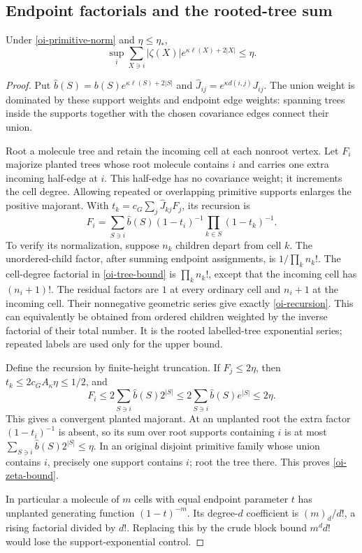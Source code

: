 \subsection{Endpoint factorials and the rooted-tree sum}

\begin{lemma}\label{oi-tree-lemma}
Under \eqref{oi-primitive-norm} and $\eta\le\eta_*$,
\begin{equation}\label{oi-zeta-bound}
 \sup_i\sum_{X\ni i}|\zeta(X)|
                  e^{\kappa\ell(X)+2|X|}\le\eta .
\end{equation}
\end{lemma}
\begin{proof}
Put $\widehat b(S)=b(S)e^{\kappa\ell(S)+2|S|}$ and
$\widehat J_{ij}=e^{\kappa d(i,j)}J_{ij}$.
The union weight is dominated by these support weights and endpoint
edge weights: spanning trees inside the supports together with
the chosen covariance edges connect their union.

Root a molecule tree and retain the incoming cell at each nonroot
vertex. Let $F_i$ majorize planted trees whose root molecule
contains $i$ and carries one extra incoming half-edge at $i$.
This half-edge has no covariance weight; it increments the cell
degree. Allowing repeated or overlapping primitive supports
enlarges the positive majorant. With
$t_k=c_G\sum_j\widehat J_{kj}F_j$, its recursion is
\begin{equation}\label{oi-recursion}
 F_i=\sum_{S\ni i}\widehat b(S)
              (1-t_i)^{-1}\prod_{k\in S}(1-t_k)^{-1}.
\end{equation}
To verify its normalization, suppose $n_k$ children depart from
cell $k$. The unordered-child factor, after summing endpoint
assignments, is $1/\prod_k n_k!$. The cell-degree factorial in
\eqref{oi-tree-bound} is $\prod_k n_k!$, except that the incoming
cell has $(n_i+1)!$. The residual factors are $1$ at every
ordinary cell and $n_i+1$ at the incoming cell. Their nonnegative
geometric series give exactly \eqref{oi-recursion}.
This can equivalently be obtained from ordered children weighted
by the inverse factorial of their total number. It is the rooted
labelled-tree exponential series; repeated labels are used only
for the upper bound.

Define the recursion by finite-height truncation. If $F_j\le2\eta$,
then $t_k\le2c_GA_\kappa\eta\le1/2$, and
\[
 F_i\le2\sum_{S\ni i}\widehat b(S)2^{|S|}
      \le2\sum_{S\ni i}\widehat b(S)e^{|S|}
      \le2\eta.
\]
This gives a convergent planted majorant. At an unplanted root
the extra factor $(1-t_i)^{-1}$ is absent, so its sum over root
supports containing $i$ is at most
$\sum_{S\ni i}\widehat b(S)2^{|S|}\le\eta$.
In an original disjoint primitive family whose union contains
$i$, precisely one support contains $i$; root the tree there.
This proves \eqref{oi-zeta-bound}.

In particular a molecule of $m$ cells with equal endpoint parameter
$t$ has unplanted generating function $(1-t)^{-m}$. Its degree-$d$
coefficient is $(m)_d/d!$, a rising factorial divided by $d!$.
Replacing this by the crude block bound $m^d d!$ would lose the
support-exponential control.
\end{proof}


